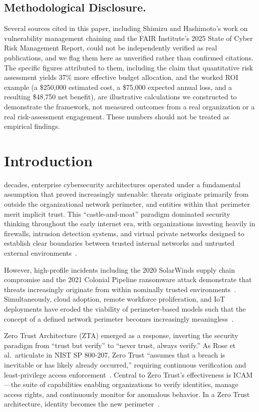 \documentclass[journal]{IEEEtran}
\begin{document}
\subsection*{Methodological Disclosure.}
Several sources cited in this paper, including Shimizu and Hashimoto's
work on vulnerability management chaining and the FAIR Institute's 2025
State of Cyber Risk Management Report, could not be independently verified
as real publications, and we flag them here as unverified rather than
confirmed citations. The specific figures attributed to them, including
the claim that quantitative risk assessment yields 37\% more effective
budget allocation, and the worked ROI example (a \$250,000 estimated cost,
a \$75,000 expected annual loss, and a resulting \$48,750 net benefit), are
illustrative calculations we constructed to demonstrate the framework, not
measured outcomes from a real organization or a real risk-assessment
engagement. These numbers should not be treated as empirical findings.

\section{Introduction}
 decades, enterprise cybersecurity architectures operated under a
fundamental assumption that proved increasingly untenable: threats originate primarily
from outside the organizational network perimeter, and entities within that perimeter
merit implicit trust. This ``castle-and-moat'' paradigm dominated security thinking
throughout the early internet era, with organizations investing heavily in firewalls,
intrusion detection systems, and virtual private networks designed to establish clear
boundaries between trusted internal networks and untrusted external
environments~\cite{rose2020zero}.

However, high-profile incidents including the 2020 SolarWinds supply chain compromise
and the 2021 Colonial Pipeline ransomware attack demonstrate that threats increasingly
originate from within nominally trusted environments~\cite{nist800207}. Simultaneously,
cloud adoption, remote workforce proliferation, and IoT deployments have eroded the
viability of perimeter-based models such that the concept of a defined network perimeter
becomes increasingly meaningless~\cite{pingidentity2024}.

Zero Trust Architecture (ZTA) emerged as a response, inverting the security paradigm
from ``trust but verify'' to ``never trust, always verify.'' As Rose et al.\ articulate
in NIST SP 800-207, Zero Trust ``assumes that a breach is inevitable or has likely
already occurred,'' requiring continuous verification and least-privilege access
enforcement~\cite{rose2020zero}. Central to Zero Trust's effectiveness is ICAM---the
suite of capabilities enabling organizations to verify identities, manage access rights,
and continuously monitor for anomalous behavior. In a Zero Trust architecture, identity
becomes the new perimeter~\cite{pingidentity2024}.
\end{document}
